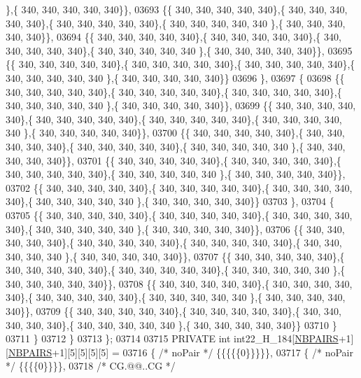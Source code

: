 \begin{DoxyCode}
      \},\{ 340, 340, 340, 340, 340\}\},
03693 \{\{ 340, 340, 340, 340, 340\},\{ 340, 340, 340, 340, 340\},\{ 340, 340, 340, 340, 340\},\{ 340, 340, 340, 340, 340
      \},\{ 340, 340, 340, 340, 340\}\},
03694 \{\{ 340, 340, 340, 340, 340\},\{ 340, 340, 340, 340, 340\},\{ 340, 340, 340, 340, 340\},\{ 340, 340, 340, 340, 340
      \},\{ 340, 340, 340, 340, 340\}\},
03695 \{\{ 340, 340, 340, 340, 340\},\{ 340, 340, 340, 340, 340\},\{ 340, 340, 340, 340, 340\},\{ 340, 340, 340, 340, 340
      \},\{ 340, 340, 340, 340, 340\}\}
03696 \},
03697 \{
03698 \{\{ 340, 340, 340, 340, 340\},\{ 340, 340, 340, 340, 340\},\{ 340, 340, 340, 340, 340\},\{ 340, 340, 340, 340, 340
      \},\{ 340, 340, 340, 340, 340\}\},
03699 \{\{ 340, 340, 340, 340, 340\},\{ 340, 340, 340, 340, 340\},\{ 340, 340, 340, 340, 340\},\{ 340, 340, 340, 340, 340
      \},\{ 340, 340, 340, 340, 340\}\},
03700 \{\{ 340, 340, 340, 340, 340\},\{ 340, 340, 340, 340, 340\},\{ 340, 340, 340, 340, 340\},\{ 340, 340, 340, 340, 340
      \},\{ 340, 340, 340, 340, 340\}\},
03701 \{\{ 340, 340, 340, 340, 340\},\{ 340, 340, 340, 340, 340\},\{ 340, 340, 340, 340, 340\},\{ 340, 340, 340, 340, 340
      \},\{ 340, 340, 340, 340, 340\}\},
03702 \{\{ 340, 340, 340, 340, 340\},\{ 340, 340, 340, 340, 340\},\{ 340, 340, 340, 340, 340\},\{ 340, 340, 340, 340, 340
      \},\{ 340, 340, 340, 340, 340\}\}
03703 \},
03704 \{
03705 \{\{ 340, 340, 340, 340, 340\},\{ 340, 340, 340, 340, 340\},\{ 340, 340, 340, 340, 340\},\{ 340, 340, 340, 340, 340
      \},\{ 340, 340, 340, 340, 340\}\},
03706 \{\{ 340, 340, 340, 340, 340\},\{ 340, 340, 340, 340, 340\},\{ 340, 340, 340, 340, 340\},\{ 340, 340, 340, 340, 340
      \},\{ 340, 340, 340, 340, 340\}\},
03707 \{\{ 340, 340, 340, 340, 340\},\{ 340, 340, 340, 340, 340\},\{ 340, 340, 340, 340, 340\},\{ 340, 340, 340, 340, 340
      \},\{ 340, 340, 340, 340, 340\}\},
03708 \{\{ 340, 340, 340, 340, 340\},\{ 340, 340, 340, 340, 340\},\{ 340, 340, 340, 340, 340\},\{ 340, 340, 340, 340, 340
      \},\{ 340, 340, 340, 340, 340\}\},
03709 \{\{ 340, 340, 340, 340, 340\},\{ 340, 340, 340, 340, 340\},\{ 340, 340, 340, 340, 340\},\{ 340, 340, 340, 340, 340
      \},\{ 340, 340, 340, 340, 340\}\}
03710 \}
03711 \}
03712 \}
03713 \};
03714 
03715 PRIVATE \textcolor{keywordtype}{int} int22\_H\_184[\hyperlink{energy__const_8h_a5e75221c779d618eab81e096f37e32ce}{NBPAIRS}+1][\hyperlink{energy__const_8h_a5e75221c779d618eab81e096f37e32ce}{NBPAIRS}+1][5][5][5][5] =
03716 \{ \textcolor{comment}{/* noPair */} \{\{\{\{\{0\}\}\}\}\},
03717 \{ \textcolor{comment}{/* noPair */} \{\{\{\{0\}\}\}\},
03718 \textcolor{comment}{/* CG.@@..CG */}

\end{DoxyCode}
